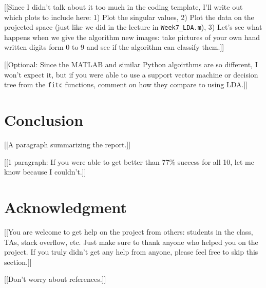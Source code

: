 \documentclass[12pt]{article}%
\begin{document}
{\color{red}[[Since I didn't talk about it too much in the coding template, I'll write out which plots to include here:  1)  Plot the singular values, 2)  Plot the data on the projected space (just like we did in the lecture in \verb|Week7_LDA.m|), 3) Let's see what happens when we give the algorithm new images:  take pictures of your own hand written digits form 0 to 9 and see if the algorithm can classify them.]]}

{\color{red}[[Optional:  Since the MATLAB and similar Python algoirthms are so different, I won't expect it, but if you were able to use a support vector machine or decision tree from the \verb|fitc| functions, comment on how they compare to using LDA.]]}


\section{Conclusion}\label{Sec: Conclusion}

{\color{red}[[A paragraph summarizing the report.]]}


{\color{red}[[1 paragraph:  If you were able to get better than 77\% success for all 10, let me know because I couldn't.]]}


\section*{Acknowledgment}

{\color{red}[[You are welcome to get help on the project from others:  students in the class, TAs, stack overflow, etc.  Just make sure to thank anyone who helped you on the project.  If you truly didn't get any help from anyone, please feel free to skip this section.]]}


\bigskip
\bigskip
\bigskip

{\color{red}[[Don't worry about references.]]}
\end{document}
